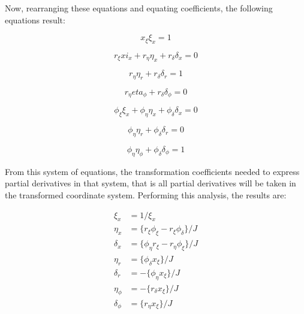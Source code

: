 Now, rearranging these equations and equating coefficients, the following
equations result:

\begin{equation}
  x_\xi \xi_x = 1
\end{equation}

\begin{equation}
  r_\xi xi_x + r_\eta \eta_x + r_\delta \delta_x = 0
\end{equation}

\begin{equation}
  r_\eta \eta_r + r_\delta \delta_r = 1
\end{equation}

\begin{equation}
  r_\eta eta_\phi + r_\delta \delta_\phi = 0
\end{equation}

\begin{equation}
  \phi_\xi \xi_x + \phi_\eta \eta_x + \phi_\delta \delta_x = 0
\end{equation}


\begin{equation}
  \phi_\eta \eta_r + \phi_\delta \delta_r = 0
\end{equation}

\begin{equation}
  \phi_\eta \eta_\phi + \phi_\delta \delta_\phi = 1
\end{equation}




From this system of equations, the transformation coefficients needed to express partial derivatives in that system, that is all partial derivatives will be taken in the transformed coordinate system. Performing this analysis, the results are:

\begin{equation}
  \begin{aligned}
  \xi_x &= 1 / \xi_x \\
  \eta_x &= \{ r_\xi\phi_\xi - r_\xi \phi_\delta \} / J \\
  \delta_x &= \{ \phi_\eta r_\xi - r_\eta \phi_\xi \} / J \\
  \eta_r &= \{ \phi_\delta x_\xi \} / J \\
  \delta_r &= - \{ \phi_\eta x_\xi \} / J \\
  \eta_\phi &= - \{ r_\delta x_\xi \} / J \\
  \delta_\phi &= \{ r_\eta x_\xi \} / J
\end{aligned}
\end{equation}

